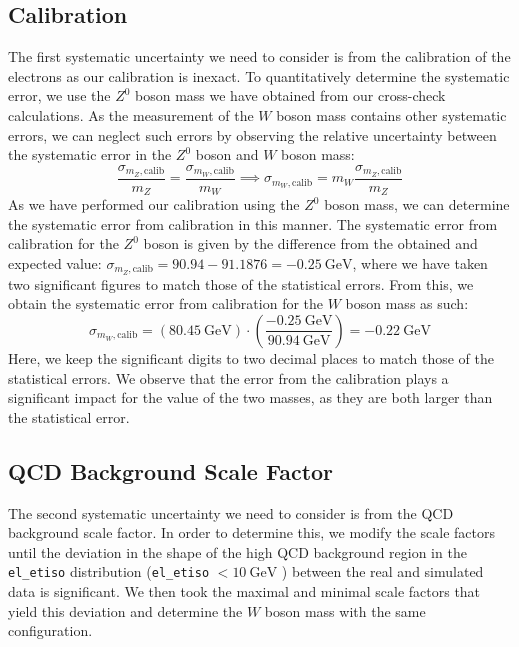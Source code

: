 \documentclass[a4paper]{report}
\numberwithin{equation}{section}
\begin{document}
\subsection{Calibration}

The first systematic uncertainty we need to consider is from the calibration of the electrons as our calibration is inexact. 
To quantitatively determine the systematic error, we use the $Z^0$ boson mass we have obtained from our cross-check calculations.
As the measurement of the $W$ boson mass contains other systematic errors, we can neglect such errors by observing the 
relative uncertainty between the systematic error in the $Z^0$ boson and $W$ boson mass:
\begin{equation}
    \frac{\sigma_{m_Z, \mathrm{calib}}}{m_Z} = \frac{\sigma_{m_W, \mathrm{calib}}}{m_W} \implies \sigma_{m_W, \mathrm{calib}} = m_W \frac{\sigma_{m_Z, \mathrm{calib}}}{m_Z}
\end{equation} 
As we have performed our calibration using the $Z^0$ boson mass, we can determine the systematic error from calibration in this manner. 
The systematic error from calibration for the $Z^0$ boson is given by the difference from the obtained and 
expected value: $\sigma_{m_Z, \mathrm{calib}} = 90.94 - 91.1876 = -\SI{0.25}{\giga\electronvolt}$, where we have taken two 
significant figures to match those of the statistical errors. From this, we obtain the 
systematic error from calibration for the $W$ boson mass as such: 
\begin{equation}
    \sigma_{m_W, \mathrm{calib}} = (\SI{80.45}{\giga\electronvolt}) \cdot \left( \frac{\SI{-0.25}{\giga\electronvolt}}{\SI{90.94}{\giga\electronvolt}}\right) = -\SI{0.22}{\giga\electronvolt}
\end{equation}
Here, we keep the significant digits to two decimal places to match those of the statistical errors. We observe that the 
error from the calibration plays a significant impact for the value of the two masses, as they are both larger than the 
statistical error. 

\subsection{QCD Background Scale Factor}

The second systematic uncertainty we need to consider is from the QCD background scale factor. In order to determine this, we modify 
the scale factors until the deviation in the shape of the high QCD background region in the \texttt{el\_etiso} distribution 
(\texttt{el\_etiso} $< \SI{10}{\giga\electronvolt}$ ) between the real and simulated data is significant. We then took the 
maximal and minimal scale factors that yield this deviation and determine the $W$ boson mass with the same configuration. \par 
\end{document}
